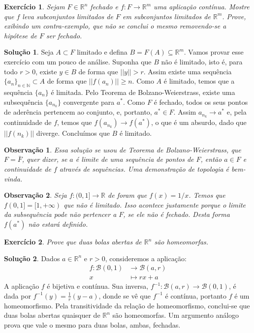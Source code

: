 \documentclass[a4paper,12pt]{article}
\newcommand{\R}{\mathbb{R}}
\newcommand{\B}{\mathcal{B}}
\theoremstyle{exer}
\newtheorem{exercise}{Exercício}
\theoremstyle{definition}
\newtheorem{solution}{Solução}
\theoremstyle{plain}
\newtheorem{remark}{Observação}
\begin{document}
\begin{exercise}
    Sejam $F \in \R^n$ fechado e $f : F \to \R^m$ uma aplicação contínua.
    Mostre que $f$ leva subconjuntos limitados de $F$ em subconjuntos
    limitados de $\R^m$. Prove, exibindo um contra-exemplo, que não se conclui o mesmo removendo-se a hipótese de $F$ ser fechado.
\end{exercise}

\begin{solution}
    Seja $A \subset F$ limitado e defina $B = F(A) \subseteq \R^m$. Vamos
    provar esse exercício com um pouco de análise. Suponha que $B$ não é
    limitado, isto é, para todo $r > 0$, existe $y \in B$ de forma que $||y||
    > r$. Assim existe uma sequência $\{a_n\}_{n \in \mathbb{N}} \subset
    A$ de forma que $||f(a_n)|| \ge n$. Como $A$ é limitado, temos que a
    sequência $\{a_n\}$ é limitada. Pelo Teorema de Bolzano-Weierstrass,
    existe uma subsequência $\{a_{n_k}\}$ convergente para $a^*$. Como $F$ é fechado, todos os seus pontos de aderência pertencem ao
    conjunto, e, portanto, $a^* \in F$. Assim $a_{n_k} \to a^*$ e, pela
    continuidade de $f$, temos que $f(a_{n_k}) \to f(a^*)$, o que é um
    absurdo, dado que $||f(n_k)||$ diverge. Concluímos que $B$ é limitado.
\end{solution}

\begin{remark}
    Essa solução se usou de Teorema de Bolzano-Weierstrass, que $F =
    \bar{F}$, quer dizer, se $a$ é limite de uma sequência de pontos de $F$,
    então $a \in F$ e continuidade de $f$ através de sequências. Uma
    demonstração de topologia é bem-vinda. 
\end{remark}

\begin{remark}
    Seja $f : (0,1] \to \R$ de foram que $f(x) = 1/x$. Temos que $f(0,1] = [1,
    + \infty)$ que não é limitado. Isso acontece justamente porque o limite da
    subsequência pode não pertencer a $F$, se ele não é fechado. Desta forma
    $f(a^*)$ não estará definido. 
\end{remark}

\begin{exercise}
    Prove que duas bolas abertas de $\R^n$ são homeomorfas.
\end{exercise}

\begin{solution}
    Dados $a \in \R^n$ e $r > 0$, consideremos a aplicação:
    \begin{align*}
        f : \B(0, 1) &\to \B(a, r)\\
        x &\mapsto rx + a        
    \end{align*}
    A aplicação $f$ é bijetiva e contínua. Sua inversa, $f^{-1} : \B(a, r) \to
    \B(0, 1)$, é dada por $f^{-1}(y) = \frac{1}{r}(y - a)$, donde se vê que
    $f^{-1}$ é contínua, portanto $f$ é um homeomorfismo. Pela transitividade
    da relação de homeomorfismo, conclui-se que duas bolas abertas quaisquer de
    $\R^n$ são homeomorfas. Um argumento análogo prova que vale o mesmo para duas bolas, ambas, fechadas.
\end{solution}
\end{document}
